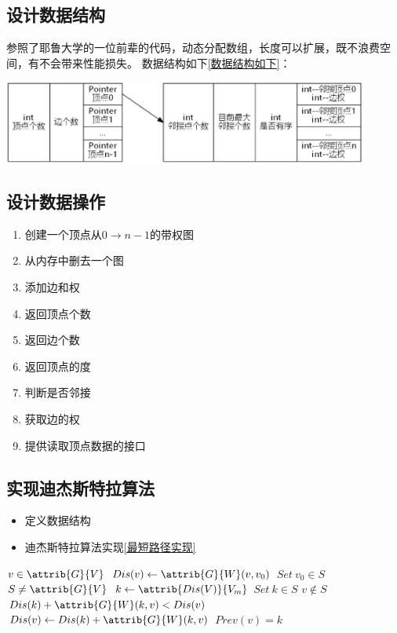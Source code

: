 \documentclass[a4paper,10pt]{ctexart}
\begin{document}
\subsection{设计数据结构}
参照了耶鲁大学的一位前辈的代码，动态分配数组，长度可以扩展，既不浪费空间，有不会带来性能损失。
数据结构如下\ref{数据结构如下}：


\includegraphics[width=0.9\textwidth]{../Pics/DataStruct.eps}

\subsection{设计数据操作}
\begin{enumerate}
  \item 创建一个顶点从$0 \to n-1$的带权图
  \item 从内存中删去一个图
  \item 添加边和权
  \item 返回顶点个数
  \item 返回边个数
  \item 返回顶点的度
  \item 判断是否邻接
  \item 获取边的权
  \item 提供读取顶点数据的接口
\end{enumerate}

\subsection{实现迪杰斯特拉算法}
\begin{itemize}
  \item 定义数据结构
  \item 迪杰斯特拉算法实现\ref{最短路径实现}
\end{itemize}
\begin{codebox}
\li \For $v \in \attrib{G}{V}$
    \Do
\li     $Dis(v) \gets \attrib{G}{W}(v,v_0)$
    \End
\li $Set \  v_0 \in S$
\li \While $S \ne \attrib{G}{V}$
    \Do
\li     $k \gets \attrib{Dis(V)}{V_m}$
\li     $Set \  k \in S$
\li     \For $v \notin S$
        \Do
\li        \If $Dis(k) + \attrib{G}{W}(k,v) < Dis(v)$
\li        \Then $Dis(v) \gets Dis(k) + \attrib{G}{W}(k,v)$
\li        $Prev(v) = k $
        \End
    \End
\end{codebox}
\end{document}
